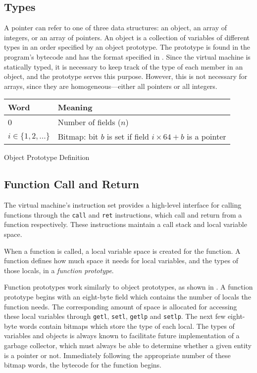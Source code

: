 		\subsection{Types}
		A pointer can refer to one of three data structures: an object, an array of integers, or an array of pointers. An object is a collection of variables of different types in an order specified by an object prototype. The prototype is found in the program's bytecode and has the format specified in . Since the virtual machine is statically typed, it is necessary to keep track of the type of each member in an object, and the prototype serves this purpose. However, this is not necessary for arrays, since they are homogeneous---either all pointers or all integers.
		
		\begin{myfigure}
			\begin{tabular}{|l|l| }
				\hline
				Word & Meaning \\
				\hline
				0 & Number of fields ($n$) \\
				\hline
				$i \in \{1, 2, ...\}$ & Bitmap: bit $b$ is set if field $i\times64 + b$ is a pointer \\
				\hline
			\end{tabular}
			\caption{Object Prototype Definition}
			\label{fig:objproto}
		\end{myfigure}
		
		\subsection{Function Call and Return}
		The virtual machine's instruction set provides a high-level interface for calling functions through the \texttt{call} and \texttt{ret} instructions, which call and return from a function respectively. These instructions maintain a call stack and local variable space.
		
		When a function is called, a local variable space is created for the function. A function defines how much space it needs for local variables, and the types of those locals, in a \emph{function prototype}. 
		
		Function prototypes work similarly to object prototypes, as shown in . A function prototype begins with an eight-byte field which contains the number of locals the function needs. The corresponding amount of space is allocated for accessing these local variables through \texttt{getl}, \texttt{setl}, \texttt{getlp} and \texttt{setlp}. The next few eight-byte words contain bitmaps which store the type of each local. The types of variables and objects is always known to facilitate future implementation of a garbage collector, which must always be able to determine whether a given entity is a pointer or not. Immediately following the appropriate number of these bitmap words, the bytecode for the function begins.
		
